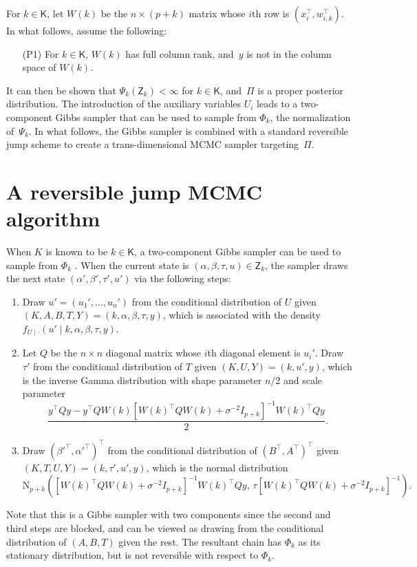 \documentclass[12pt]{article}
\makeatletter
\def\namedlabel#1#2{\begingroup
	#2%
	\def\@currentlabel{#2}%
	\phantomsection\label{#1}\endgroup
}
\newcommand{\Z}{\mathsf{Z}}
\makeatother
\begin{document}
	
	For $k \in \mathsf{K}$, let $W(k)$ be the $n \times (p+k)$ matrix whose $i$th row is $(x_i^{\top}, w_{i,k}^{\top})$.
	In what follows, assume the following:
	\begin{enumerate}
		\item [\namedlabel{P1}{(P1)}] For $k \in \mathsf{K}$, $W(k)$ has full column rank, and~$y$ is not in the column space of $W(k)$.
	\end{enumerate}
	It can then be shown that $\Psi_k(\Z_k) < \infty$ for $k \in \mathsf{K}$, and~$\Pi$ is a proper posterior distribution.
	The introduction of the auxiliary variables $U_i$ leads to a two-component Gibbs sampler that can be used to sample from $\Phi_k$, the normalization of~$\Psi_k$. 
	In what follows, the Gibbs sampler is combined with a standard reversible jump scheme to create a trans-dimensional MCMC sampler targeting~$\Pi$.
	
	
	\section{A reversible jump MCMC algorithm} \label{sssec:autogibbs}
	
	When $K$ is known to be $k \in \mathsf{K}$, a two-component Gibbs sampler can be used to sample from $\Phi_k$ \citep{choi2013analysis}.
	When the current state is $(\alpha,\beta,\tau,u) \in \Z_k$, the sampler draws the next state $(\alpha',\beta',\tau',u')$ via the following steps:
	\begin{enumerate}
		\item Draw $u' = (u_1', \dots,u_n')$ from the conditional distribution of $U$ given $(K,A,B,T,Y) = (k, \alpha, \beta, \tau,y)$, which is associated with the density $f_{U \mid \cdot}(u' \mid k, \alpha, \beta, \tau, y)$.
		\item 
		Let $Q $ be the $n \times n$ diagonal matrix whose $i$th diagonal element is $u_i'$.
		Draw $\tau'$ from the conditional distribution of $T$ given $(K,U,Y) = (k, u', y)$, which is the inverse Gamma distribution with shape parameter $n/2$ and scale parameter
		\[
		\frac{y^{\top} Q y - y^{\top} Q W(k) [W(k)^{\top} Q W(k) + \sigma^{-2} I_{p+k}]^{-1} W(k)^{\top} Q y }{2}.
		\]
		\item 
		Draw $(\beta'^{\top}, \alpha'^{\top})^{\top}$ from the conditional distribution of $(B^{\top}, A^{\top})^{\top}$ given $(K,T,U,Y) = (k,\tau', u', y)$, which is the normal distribution
		\[
		\mbox{N}_{p+k} \left( [W(k)^{\top} Q W(k) + \sigma^{-2} I_{p+k}]^{-1} W(k)^{\top} Q y, \, \tau [W(k)^{\top} Q W(k) + \sigma^{-2} I_{p+k}]^{-1} \right).
		\]
	\end{enumerate}
	Note that this is a Gibbs sampler with two components since the second and third steps are blocked, and can be viewed as drawing from the conditional distribution of $(A,B,T)$ given the rest.
	{ The resultant chain has $\Phi_k$ as its stationary distribution, but is not reversible with respect to $\Phi_k$.}
	
\end{document}
